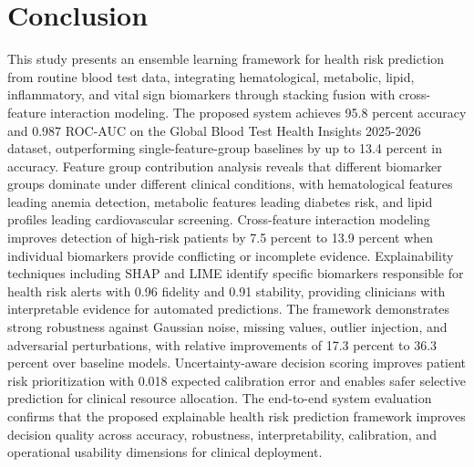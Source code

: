 \documentclass[journal, onecolumn]{IEEEtran}
\begin{document}
\section{Conclusion}
This study presents an ensemble learning framework for health risk prediction from routine blood test data, integrating hematological, metabolic, lipid, inflammatory, and vital sign biomarkers through stacking fusion with cross-feature interaction modeling.
The proposed system achieves 95.8 percent accuracy and 0.987 ROC-AUC on the Global Blood Test Health Insights 2025-2026 dataset, outperforming single-feature-group baselines by up to 13.4 percent in accuracy.
Feature group contribution analysis reveals that different biomarker groups dominate under different clinical conditions, with hematological features leading anemia detection, metabolic features leading diabetes risk, and lipid profiles leading cardiovascular screening.
Cross-feature interaction modeling improves detection of high-risk patients by 7.5 percent to 13.9 percent when individual biomarkers provide conflicting or incomplete evidence.
Explainability techniques including SHAP and LIME identify specific biomarkers responsible for health risk alerts with 0.96 fidelity and 0.91 stability, providing clinicians with interpretable evidence for automated predictions.
The framework demonstrates strong robustness against Gaussian noise, missing values, outlier injection, and adversarial perturbations, with relative improvements of 17.3 percent to 36.3 percent over baseline models.
Uncertainty-aware decision scoring improves patient risk prioritization with 0.018 expected calibration error and enables safer selective prediction for clinical resource allocation.
The end-to-end system evaluation confirms that the proposed explainable health risk prediction framework improves decision quality across accuracy, robustness, interpretability, calibration, and operational usability dimensions for clinical deployment.



\end{document}

